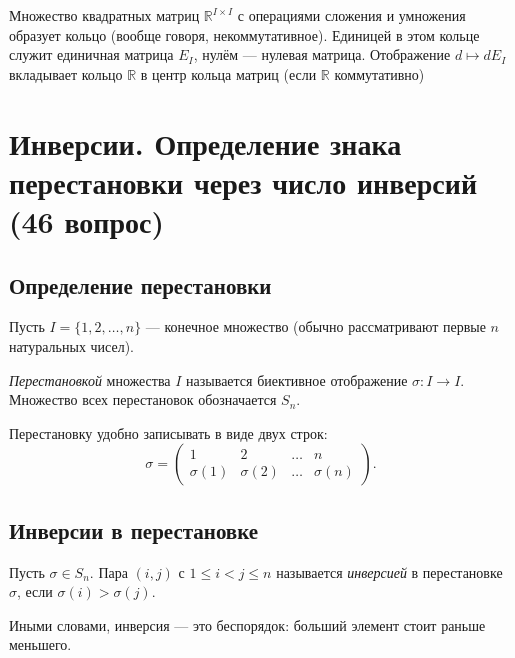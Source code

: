 \documentclass[a4paper,12pt]{article}
\theoremstyle{definition}
\theoremstyle{plain}
\theoremstyle{remark}
\begin{document}
	Множество квадратных матриц \( \mathbb{R}^{I \times I} \) с операциями сложения и умножения образует кольцо (вообще говоря, некоммутативное). Единицей в этом кольце служит единичная матрица \( E_I \), нулём — нулевая матрица. Отображение \( d \mapsto d E_I \) вкладывает кольцо \( \mathbb{R} \) в центр кольца матриц (если \( \mathbb{R} \) коммутативно)
	
	
	
	
	\newpage
	\section{Инверсии. Определение знака перестановки через число инверсий (46 вопрос)}
	
	\subsection{Определение перестановки}
	
	Пусть \( I = \{1, 2, \dots, n\} \) — конечное множество (обычно рассматривают первые \( n \) натуральных чисел).
	
	\begin{tcolorbox}[colback=blue!5, colframe=blue!40!black, title=Определение]
		\textit{Перестановкой} множества \( I \) называется биективное отображение \( \sigma: I \to I \). Множество всех перестановок обозначается \( S_n \).
	\end{tcolorbox}
	
	Перестановку удобно записывать в виде двух строк:
	\[
	\sigma = \begin{pmatrix}
		1 & 2 & \dots & n \\
		\sigma(1) & \sigma(2) & \dots & \sigma(n)
	\end{pmatrix}.
	\]
	
	\subsection{Инверсии в перестановке}
	
	\begin{tcolorbox}[colback=green!5, colframe=green!50!black, title=Определение инверсии]
		Пусть \( \sigma \in S_n \). Пара \( (i, j) \) с \( 1 \leq i < j \leq n \) называется \textit{инверсией} в перестановке \( \sigma \), если \( \sigma(i) > \sigma(j) \).
	\end{tcolorbox}
	
	Иными словами, инверсия — это беспорядок: больший элемент стоит раньше меньшего.
	
\end{document}
